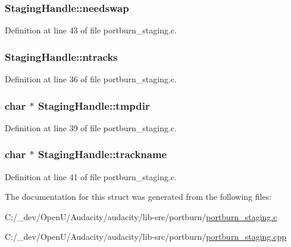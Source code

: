 \subsubsection[{\texorpdfstring{needswap}{needswap}}]{ Staging\+Handle\+::needswap}\hypertarget{struct_staging_handle_a3a39e20633115543ed82aabc01bc7a86}{}\label{struct_staging_handle_a3a39e20633115543ed82aabc01bc7a86}


Definition at line 43 of file portburn\+\_\+staging.\+c.

\subsubsection[{\texorpdfstring{ntracks}{ntracks}}]{ Staging\+Handle\+::ntracks}\hypertarget{struct_staging_handle_a81acff94a7373df51df6237155359f2a}{}\label{struct_staging_handle_a81acff94a7373df51df6237155359f2a}


Definition at line 36 of file portburn\+\_\+staging.\+c.

\subsubsection[{\texorpdfstring{tmpdir}{tmpdir}}]{\setlength{\rightskip}{0pt plus 5cm}char $\ast$ Staging\+Handle\+::tmpdir}\hypertarget{struct_staging_handle_abcea901716e4e3651724fec56108c0d4}{}\label{struct_staging_handle_abcea901716e4e3651724fec56108c0d4}


Definition at line 39 of file portburn\+\_\+staging.\+c.

\subsubsection[{\texorpdfstring{trackname}{trackname}}]{\setlength{\rightskip}{0pt plus 5cm}char $\ast$ Staging\+Handle\+::trackname}\hypertarget{struct_staging_handle_a5890eb2011737b581f3aa35c1088e3bb}{}\label{struct_staging_handle_a5890eb2011737b581f3aa35c1088e3bb}


Definition at line 41 of file portburn\+\_\+staging.\+c.



The documentation for this struct was generated from the following files\+:\begin{DoxyCompactItemize}
\item 
C\+:/\+\_\+dev/\+Open\+U/\+Audacity/audacity/lib-\/src/portburn/\hyperlink{portburn__staging_8c}{portburn\+\_\+staging.\+c}\item 
C\+:/\+\_\+dev/\+Open\+U/\+Audacity/audacity/lib-\/src/portburn/\hyperlink{portburn__staging_8cpp}{portburn\+\_\+staging.\+cpp}\end{DoxyCompactItemize}
